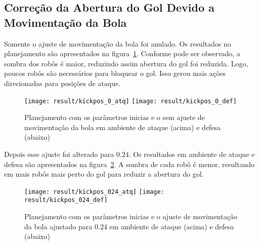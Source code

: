 \subsection{Correção da Abertura do Gol Devido a Movimentação da Bola}

Somente o ajuste de movimentação da bola foi anulado. Os resultados
no planejamento são apresentados na figura~\ref{fig:kickpos_0}.
Conforme pode ser observado, a sombra dos robôs é maior, reduzindo
assim abertura do gol foi reduzida. Logo, poucos robôs são necessários
para bloquear o gol. Isso gerou mais ações direcionadas para posições
de ataque.

\begin{figure}[H]
  \centering
  \texttt{[image: result/kickpos\_0\_atq]}
  \texttt{[image: result/kickpos\_0\_def]}
  \caption{Planejamento com os parâmetros inicias e o sem ajuste
           de movimentação da bola em ambiente de
           ataque (acima) e defesa (abaixo)}\label{fig:kickpos_0}
\end{figure}

Depois esse ajuste foi alterado para $0.24$. Os resultados 
em ambiente de ataque e defesa são apresentados na
figura~\ref{fig:kickpos_024}. A sombra de cada robô é
menor, resultando em mais robôs mais perto do gol para
reduzir a abertura do gol.

\begin{figure}[H]
  \centering
  \texttt{[image: result/kickpos\_024\_atq]}
  \texttt{[image: result/kickpos\_024\_def]}
  \caption{Planejamento com os parâmetros inicias e o ajuste de
           movimentação da bola ajustado para $0.24$ em ambiente de
           ataque (acima) e defesa (abaixo)}\label{fig:kickpos_024}
\end{figure}
